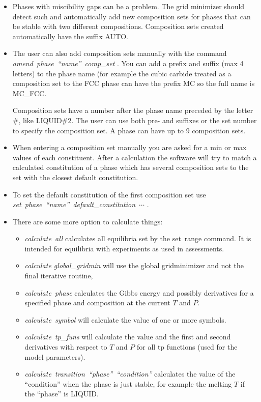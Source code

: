 \documentclass[12pt]{article}
\begin{document}
\begin{itemize}
\item Phases with miscibility gaps can be a problem.  The grid
  minimizer should detect such and automatically add new composition
  sets for phases that can be stable with two different compositions.
  Composition sets created automatically have the suffix AUTO.

\item The user can also add composition sets manually with the
  command\\ {\em amend~phase~``name''~comp\_set }.  You can add a
  prefix and suffix (max 4 letters) to the phase name (for example the
  cubic carbide treated as a composition set to the FCC phase can have
  the prefix MC so the full name is MC\_FCC.

  Composition sets have a number after the phase name preceded by the
  letter \#, like LIQUID\#2.  The user can use both pre- and suffixes
  or the set number to specify the composition set.  A phase can have
  up to 9 composition sets.

\item When entering a composition set manually you are asked for a min
  or max values of each constituent.  After a calculation the software
  will try to match a calculated constitution of a phase which has
  several composition sets to the set with the closest default
  constitution.

\item To set the default constitution of the first composition set use
  {\em set~phase~``name''~default\_constitution~$\cdots$ }.

\item There are some more option to calculate things:
  \begin{itemize} 
  \item {\em calculate~all} calculates all equilibria set by the {\rm
    set~range} command.  It is intended for equilibria with
    experiments as used in assessments.
  \item {\em calculate global\_gridmin} will use the global
    gridminimizer and not the final iterative routine,
  \item {\em calculate~phase} calculates the Gibbs energy and possibly
    derivatives for a specified phase and composition at the current $T$
    and $P$.
  \item {\em calculate~symbol} will calculate the value of one or more
    symbols.
  \item {\em calculate~tp\_funs} will calculate the value and the
    first and second derivatives with respect to $T$ and $P$ for all
    tp functions (used for the model parameters).
  \item {\em calculate~transition~``phase''~``condition''} calculates
    the value of the ``condition'' when the phase is just stable, for
    example the melting $T$ if the ``phase'' is LIQUID.
  \end{itemize}
\end{itemize}
\end{document}
